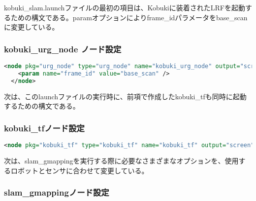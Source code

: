 kobuki\_slam.launchファイルの最初の項目は、Kobukiに装着されたLRFを起動するための構文である。paramオプションによりframe\_idパラメータをbase\_scanに変更している。

\subsubsection{kobuki\_urg\_node ノード設定}

\begin{lstlisting}[language=XML]
  <node pkg="urg_node" type="urg_node" name="kobuki_urg_node" output="screen">
    <param name="frame_id" value="base_scan" />
  </node>
\end{lstlisting}

次は、このlaunchファイルの実行時に、前項で作成したkobuki\_tfも同時に起動するための構文である。

\subsubsection{kobuki\_tfノード設定}

\begin{lstlisting}[language=XML]
<node pkg="kobuki_tf" type="kobuki_tf" name="kobuki_tf" output="screen"> </node>
\end{lstlisting}

次は、slam\_gmappingを実行する際に必要なさまざまなオプションを、使用するロボットとセンサに合わせて変更している。

\subsubsection{slam\_gmappingノード設定}

